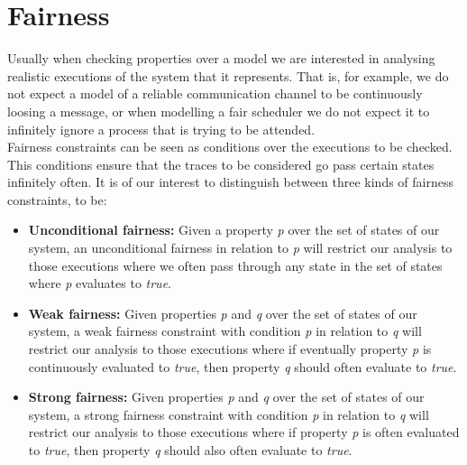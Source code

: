 \documentclass{llncs2e/llncs}
\newcommand{\textps}[1]{\textit{#1}}                    %
\begin{document}


\section{Fairness}\label{fairness}

Usually when checking properties over a model we are interested in analysing 
realistic executions of the system that it represents. That is, for example, we do not expect a model of a reliable communication channel to be continuously loosing a message, or when modelling a fair scheduler we do not expect it to infinitely ignore a process that is trying to be attended.\\
Fairness constraints can be seen as conditions over the executions to be checked. This conditions ensure that the traces to be considered go pass certain states infinitely often. It is of our interest to distinguish between three kinds of fairness constraints, to be:
\begin{itemize}
\item \textbf{Unconditional fairness:} Given a property \textps{p} over the
set of states of our system, an unconditional fairness in relation to
\textps{p} will restrict our analysis to those executions where we often pass
through any state in the set of states where \textps{p} evaluates to
\textps{true}.

\item \textbf{Weak fairness:} Given properties \textps{p} and \textps{q}
over the set of states of our system, a weak fairness constraint with
condition \textps{p} in relation to \textps{q} will restrict our analysis
to those executions where if eventually property \textps{p} is continuously
evaluated to \textps{true}, then property \textps{q} should often evaluate
to \textps{true}.

\item \textbf{Strong fairness:} Given properties \textps{p} and \textps{q}
over the set of states of our system, a strong fairness constraint with
condition \textps{p} in relation to \textps{q} will restrict our analysis
to those executions where if property \textps{p} is often evaluated to 
\textps{true}, then property \textps{q} should also often evaluate to
\textps{true}.

\end{itemize}
\end{document}
